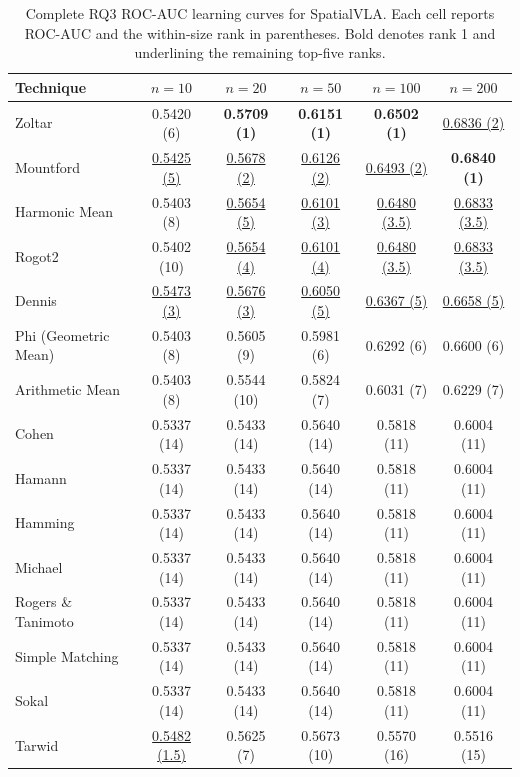 \begin{table}[t]
\centering
\caption{Complete RQ3 ROC-AUC learning curves for SpatialVLA. Each cell reports ROC-AUC and the within-size rank in parentheses. Bold denotes rank 1 and underlining the remaining top-five ranks.}
\label{tab:rq3v2-learning-curves-spatialvla}
{\scriptsize
\setlength{\tabcolsep}{5pt}
\begin{tabular}{lccccc}
\toprule
Technique & $n=10$ & $n=20$ & $n=50$ & $n=100$ & $n=200$ \\
\midrule
Zoltar & 0.5420 (6) & \textbf{0.5709 (1)} & \textbf{0.6151 (1)} & \textbf{0.6502 (1)} & \underline{0.6836 (2)} \\
Mountford & \underline{0.5425 (5)} & \underline{0.5678 (2)} & \underline{0.6126 (2)} & \underline{0.6493 (2)} & \textbf{0.6840 (1)} \\
Harmonic Mean & 0.5403 (8) & \underline{0.5654 (5)} & \underline{0.6101 (3)} & \underline{0.6480 (3.5)} & \underline{0.6833 (3.5)} \\
Rogot2 & 0.5402 (10) & \underline{0.5654 (4)} & \underline{0.6101 (4)} & \underline{0.6480 (3.5)} & \underline{0.6833 (3.5)} \\
Dennis & \underline{0.5473 (3)} & \underline{0.5676 (3)} & \underline{0.6050 (5)} & \underline{0.6367 (5)} & \underline{0.6658 (5)} \\
Phi (Geometric Mean) & 0.5403 (8) & 0.5605 (9) & 0.5981 (6) & 0.6292 (6) & 0.6600 (6) \\
Arithmetic Mean & 0.5403 (8) & 0.5544 (10) & 0.5824 (7) & 0.6031 (7) & 0.6229 (7) \\
Cohen & 0.5337 (14) & 0.5433 (14) & 0.5640 (14) & 0.5818 (11) & 0.6004 (11) \\
Hamann & 0.5337 (14) & 0.5433 (14) & 0.5640 (14) & 0.5818 (11) & 0.6004 (11) \\
Hamming & 0.5337 (14) & 0.5433 (14) & 0.5640 (14) & 0.5818 (11) & 0.6004 (11) \\
Michael & 0.5337 (14) & 0.5433 (14) & 0.5640 (14) & 0.5818 (11) & 0.6004 (11) \\
Rogers \& Tanimoto & 0.5337 (14) & 0.5433 (14) & 0.5640 (14) & 0.5818 (11) & 0.6004 (11) \\
Simple Matching & 0.5337 (14) & 0.5433 (14) & 0.5640 (14) & 0.5818 (11) & 0.6004 (11) \\
Sokal & 0.5337 (14) & 0.5433 (14) & 0.5640 (14) & 0.5818 (11) & 0.6004 (11) \\
Tarwid & \underline{0.5482 (1.5)} & 0.5625 (7) & 0.5673 (10) & 0.5570 (16) & 0.5516 (15) \\

\end{tabular}}
\end{table}
